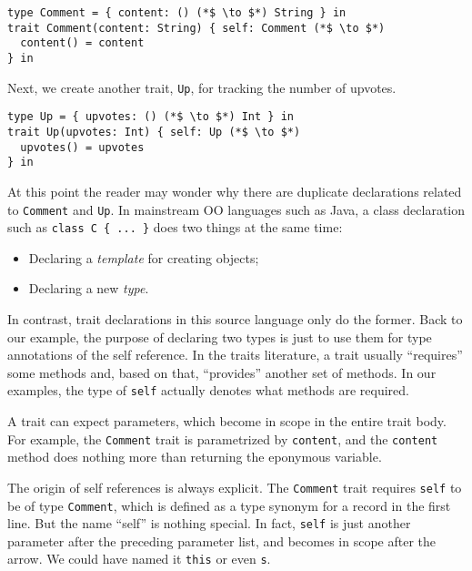 \begin{lstlisting}
type Comment = { content: () (*$ \to $*) String } in
trait Comment(content: String) { self: Comment (*$ \to $*)
  content() = content
} in
\end{lstlisting}

\noindent Next, we create another trait, \lstinline$Up$, for tracking the number
of upvotes.

\begin{lstlisting}
type Up = { upvotes: () (*$ \to $*) Int } in
trait Up(upvotes: Int) { self: Up (*$ \to $*)
  upvotes() = upvotes
} in
\end{lstlisting}

At this point the reader may wonder why there are duplicate declarations related
to \lstinline$Comment$ and \lstinline$Up$. In mainstream OO languages such as
Java, a class declaration such as \lstinline$class C { ... }$ does two things at
the same time:

\begin{itemize}
\item Declaring a \emph{template} for creating objects;
\item Declaring a new \emph{type}.
\end{itemize}

\noindent In contrast, trait declarations in this source language only do the
former. Back to our example, the purpose of declaring two types is just to use
them for type annotations of the self reference.  In the traits literature, a trait
usually ``requires'' some methods and, based on that,  ``provides'' another set
of methods. In our examples, the type of \lstinline$self$ actually denotes what
methods are required.

A trait can expect parameters, which become in scope in the entire trait body.
For example, the \lstinline$Comment$ trait is parametrized by
\lstinline$content$, and the \lstinline$content$ method does nothing more than
returning the eponymous variable.

The origin of self references is always explicit. The \lstinline$Comment$ trait
requires \lstinline$self$ to be of type \lstinline$Comment$, which is defined
as a type synonym for a record in the first line. But the name ``self'' is
nothing special. In fact, \lstinline$self$ is just another parameter after the
preceding parameter list, and becomes in scope after the arrow. We could have
named it \lstinline$this$ or even \lstinline$s$.

